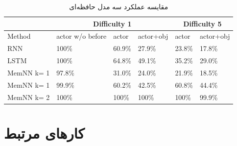 \documentclass[12pt, a4paper, oneside]{report}
\begin{document}
\begin{table}[!ht]
    \begin{small}
    \begin{center}
      \begin{latin}
      \begin{tabular}{|l||l|l|l||l|l|}
        \hline
         & \multicolumn{3}{c|}{Difficulty 1} & \multicolumn{2}{c|}{Difficulty 5} \\
        \hline
        Method & actor w/o before & actor & actor+obj & actor & actor+obj \\
        \hline
        RNN & 100\% & 60.9\% & 27.9\% & 23.8\% & 17.8\% \\
        LSTM & 100\% & 64.8\% & 49.1\% & 35.2\% & 29.0\% \\
        \hline
        MemNN k= 1 & 97.8\% & 31.0\% & 24.0\% & 21.9\% & 18.5\% \\
        MemNN k= 1 & 99.9\% & 60.2\% & 42.5\% & 60.8\% & 44.4\% \\
        MemNN k= 2 & 100\% & 100\% & 100\% & 100\% & 99.9\% \\
        \hline
      \end{tabular}
      \end{latin}
      \caption{مقایسه عملکرد سه مدل حافظه‌ای}
      \label{tab:MemNN-vs-others}
    \end{center}
\end{small}
  \end{table}


\chapter{کارهای مرتبط}
\pagebreak

\end{document}
